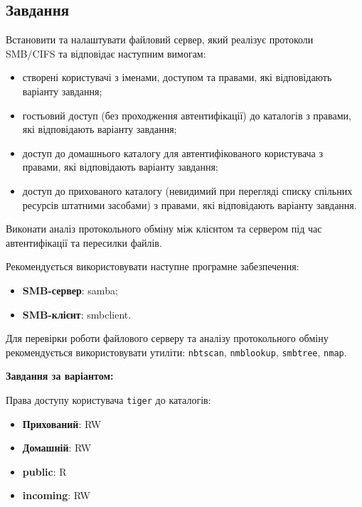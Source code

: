 \documentclass[14pt, a4paper]{extreport}
\begin{document}
	\subsection*{Завдання}
	
	Встановити та налаштувати файловий сервер, який реалізує протоколи SMB/CIFS та відповідає наступним вимогам:
	
	\begin{itemize}
		\item створені користувачі з іменами, доступом та правами, які відповідають варіанту завдання;
		
		\item гостьовий доступ (без проходження автентифікації) до каталогів з правами, які відповідають варіанту завдання;
		
		\item доступ до домашнього каталогу для автентифікованого користувача з правами, які відповідають варіанту завдання;
		
		\item доступ до прихованого каталогу (невидимий при перегляді списку спільних ресурсів штатними засобами) з правами, які відповідають варіанту завдання.
	\end{itemize}
	
	Виконати аналіз протокольного обміну між клієнтом та сервером під час автентифікації та пересилки файлів.
	
	Рекомендується використовувати наступне програмне забезпечення:
	
	\begin{itemize}
		\item \textbf{SMB-сервер}: samba;
		\item \textbf{SMB-клієнт}: smbclient.
	\end{itemize}
	
	Для перевірки роботи файлового серверу та аналізу протокольного обміну рекомендується використовувати утиліти: \texttt{nbtscan}, \texttt{nmblookup}, \texttt{smbtree}, \texttt{nmap}.
	
	\textbf{Завдання за варіантом:}
	
	Права доступу користувача \texttt{tiger} до каталогів:
	
	\begin{itemize}
		\item \textbf{Прихований}: RW
		
		\item \textbf{Домашній}: RW
		
		\item \textbf{public}: R
		
		\item \textbf{incoming}: RW
	\end{itemize}
	
\end{document}
